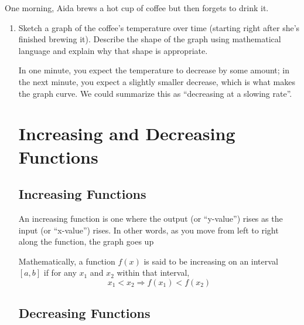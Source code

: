 \documentclass[10pt]{article}
\begin{document}
\begin{enumerate}[leftmargin=*]
    One morning, Aida brews a hot cup of coffee but then forgets to drink it. 
    \begin{enumerate}
        \item 
        \begin{problem}[\vfill] 
            Sketch a graph of the coffee's temperature over time (starting right after she's finished brewing it).
            Describe the shape of the graph using mathematical language and explain why that shape is appropriate.
        \end{problem} 
        \begin{solution} 


In one minute, you expect the temperature to decrease by some amount; in the next minute, you
            expect a slightly smaller decrease, which is what makes the graph
            curve.  We could summarize this as ``decreasing at a slowing rate''.
            
\vspace{1ex}
\section{Increasing and Decreasing Functions}

\subsection{Increasing Functions}

An increasing function is one where the output (or ``y-value'') rises as the input (or ``x-value'') rises. In other words, as you move from left to right along the function, the graph goes up

Mathematically, a function \( f(x) \) is said to be increasing on an interval \( [a, b] \) if for any \( x_1 \) and \( x_2 \) within that interval,
\[
x_1 < x_2 \Rightarrow f(x_1) < f(x_2)
\]

\subsection{Decreasing Functions}


\end{solution}
\end{enumerate}
\end{enumerate}
\end{document}
